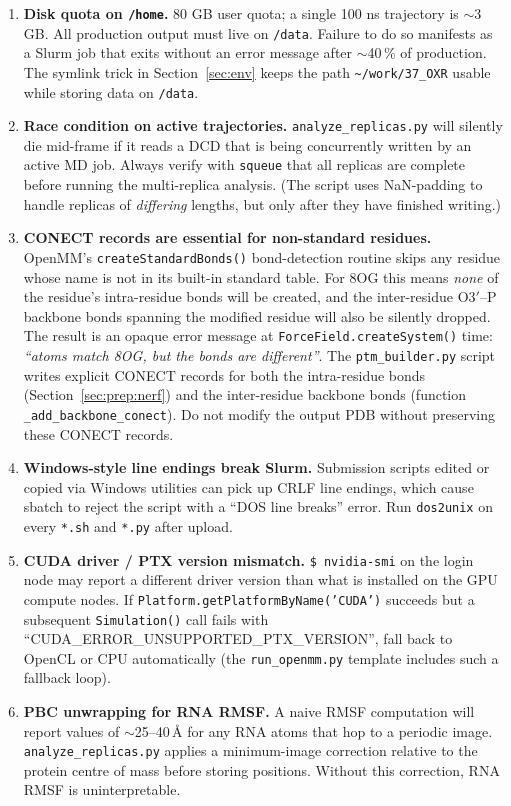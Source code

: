 \documentclass[11pt,a4paper]{article}
\begin{document}
\begin{enumerate}[leftmargin=*]
\item \textbf{Disk quota on \texttt{/home}.}
80 GB user quota; a single 100 ns trajectory is $\sim$3 GB. All
production output must live on \texttt{/data}. Failure to do so
manifests as a Slurm job that exits without an error message after
$\sim$40\,\% of production. The symlink trick in Section~\ref{sec:env}
keeps the path \texttt{\textasciitilde/work/37\_OXR} usable while
storing data on \texttt{/data}.

\item \textbf{Race condition on active trajectories.}
\texttt{analyze\_replicas.py} will silently die mid-frame if it reads
a DCD that is being concurrently written by an active MD job. Always
verify with \texttt{squeue} that all replicas are complete before
running the multi-replica analysis. (The script uses NaN-padding to
handle replicas of \emph{differing} lengths, but only after they have
finished writing.)

\item \textbf{CONECT records are essential for non-standard residues.}
OpenMM's \texttt{createStandardBonds()} bond-detection routine skips
any residue whose name is not in its built-in standard table. For 8OG
this means \emph{none} of the residue's intra-residue bonds will be
created, and the inter-residue O3$'$--P backbone bonds spanning the
modified residue will also be silently dropped. The result is an
opaque error message at \texttt{ForceField.createSystem()} time:
\emph{``atoms match 8OG, but the bonds are different''}. The
\texttt{ptm\_builder.py} script writes explicit CONECT records for
both the intra-residue bonds (Section~\ref{sec:prep:nerf}) and the
inter-residue backbone bonds (function
\texttt{\_add\_backbone\_conect}). Do not modify the output PDB without
preserving these CONECT records.

\item \textbf{Windows-style line endings break Slurm.}
Submission scripts edited or copied via Windows utilities can pick up
CRLF line endings, which cause sbatch to reject the script with a
``DOS line breaks'' error. Run \texttt{dos2unix} on every \texttt{*.sh}
and \texttt{*.py} after upload.

\item \textbf{CUDA driver / PTX version mismatch.}
\texttt{\$ nvidia-smi} on the login node may report a different driver
version than what is installed on the GPU compute nodes. If
\texttt{Platform.getPlatformByName('CUDA')} succeeds but a subsequent
\texttt{Simulation()} call fails with ``CUDA\_ERROR\_UNSUPPORTED\_PTX\_VERSION'',
fall back to OpenCL or CPU automatically (the
\texttt{run\_openmm.py} template includes such a fallback loop).

\item \textbf{PBC unwrapping for RNA RMSF.}
A naive RMSF computation will report values of $\sim$25--40\,\si{\angstrom}
for any RNA atoms that hop to a periodic image. \texttt{analyze\_replicas.py}
applies a minimum-image correction relative to the protein centre of mass
before storing positions. Without this correction, RNA RMSF is
uninterpretable.
\end{enumerate}
\end{document}
